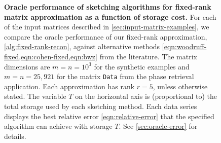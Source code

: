 \documentclass[final]{siamart1116}
\numberwithin{equation}{section}
\numberwithin{theorem}{section}
\numberwithin{figure}{section}
\begin{document}
\begin{figure}[htp!]
\caption{\textbf{Oracle performance of sketching algorithms for fixed-rank matrix approximation
as a function of storage cost.}
For each of the input matrices described in \cref{sec:input-matrix-examples},
we compare the oracle performance of our fixed-rank approximation,
\cref{alg:fixed-rank-recon}, against alternative methods
\cref{eqn:woodruff-fixed,eqn:cohen-fixed,eqn:bwz} from the literature.
The matrix dimensions are $m = n = 10^3$ for the synthetic examples
and $m = n = 25,921$ for the matrix \texttt{Data}
from the phase retrieval application.  Each approximation has rank $r = 5$, unless otherwise stated.
The variable $T$ on the horizontal axis is (proportional to) the total storage used by each
sketching method.  Each data series displays the best relative error
\cref{eqn:relative-error} that the specified algorithm can achieve with storage $T$.
See \cref{sec:oracle-error} for details.}
\label{fig:oracle-performance}
\end{figure}
\end{document}
